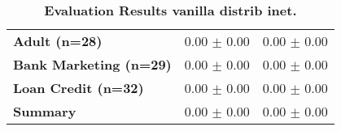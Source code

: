 \begin{table}[htb]
{\begin{tabular}{lll}
\textbf{Adult (n=28)                             } &  \phantom{0}0.00 $\pm$ \phantom{0}0.00 &             \phantom{0}0.00 $\pm$ \phantom{0}0.00 \\
\textbf{Bank Marketing (n=29)                    } &  \phantom{0}0.00 $\pm$ \phantom{0}0.00 &             \phantom{0}0.00 $\pm$ \phantom{0}0.00 \\
\textbf{Loan Credit (n=32)                       } &  \phantom{0}0.00 $\pm$ \phantom{0}0.00 &             \phantom{0}0.00 $\pm$ \phantom{0}0.00 \\
\midrule
\textbf{Summary                                  } &  \phantom{0}0.00 $\pm$ \phantom{0}0.00 &             \phantom{0}0.00 $\pm$ \phantom{0}0.00 \\
\bottomrule
\end{tabular}%
}
\caption{\textbf{Evaluation Results vanilla distrib inet.}}
\label{tab:eval-results}
\end{table}


